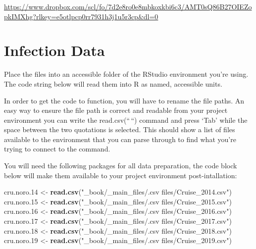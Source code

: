 \documentclass[
  11,
]{book}
\newenvironment{Shaded}{\begin{snugshade}}{\end{snugshade}}
\newcommand{\FloatTok}[1]{\textcolor[rgb]{0.06,0.06,0.06}{#1}}
\newcommand{\FunctionTok}[1]{\textcolor[rgb]{0.27,0.27,0.27}{\textbf{#1}}}
\newcommand{\NormalTok}[1]{#1}
\newcommand{\OtherTok}[1]{\textcolor[rgb]{0.37,0.37,0.37}{#1}}
\newcommand{\StringTok}[1]{\textcolor[rgb]{0.5,0.5,0.5}{#1}}
\begin{document}
\url{https://www.dropbox.com/scl/fo/7d2e8ro0e8mbkoxkbi6c3/AMT0sQ86B27OIEZopkIMXhg?rlkey=e5otlpcp0rr7931h3j1u5r3cp\&dl=0}

\hypertarget{infection-data}{%
\section*{Infection Data}\label{infection-data}}


Place the files into an accessible folder of the RStudio environment you're using. The code string below will read them into R as named, accessible units.

In order to get the code to function, you will have to rename the file paths. An easy way to ensure the file path is correct and readable from your project environment you can write the read.csv(``\,``) command and press `Tab' while the space between the two quotations is selected. This should show a list of files available to the environment that you can parse through to find what you're trying to connect to the command.

You will need the following packages for all data preparation, the code block below will make them available to your project environment post-intallation:

\begin{Shaded}
\begin{Highlighting}[]
\NormalTok{cru.noro}\FloatTok{.14} \OtherTok{\textless{}{-}} \FunctionTok{read.csv}\NormalTok{(}\StringTok{"\_book/\_main\_files/.csv files/Cruise\_2014.csv"}\NormalTok{)}
\NormalTok{cru.noro}\FloatTok{.15} \OtherTok{\textless{}{-}} \FunctionTok{read.csv}\NormalTok{(}\StringTok{"\_book/\_main\_files/.csv files/Cruise\_2015.csv"}\NormalTok{)}
\NormalTok{cru.noro}\FloatTok{.16} \OtherTok{\textless{}{-}} \FunctionTok{read.csv}\NormalTok{(}\StringTok{"\_book/\_main\_files/.csv files/Cruise\_2016.csv"}\NormalTok{)}
\NormalTok{cru.noro}\FloatTok{.17} \OtherTok{\textless{}{-}} \FunctionTok{read.csv}\NormalTok{(}\StringTok{"\_book/\_main\_files/.csv files/Cruise\_2017.csv"}\NormalTok{)}
\NormalTok{cru.noro}\FloatTok{.18} \OtherTok{\textless{}{-}} \FunctionTok{read.csv}\NormalTok{(}\StringTok{"\_book/\_main\_files/.csv files/Cruise\_2018.csv"}\NormalTok{)}
\NormalTok{cru.noro}\FloatTok{.19} \OtherTok{\textless{}{-}} \FunctionTok{read.csv}\NormalTok{(}\StringTok{"\_book/\_main\_files/.csv files/Cruise\_2019.csv"}\NormalTok{)}
\end{Highlighting}
\end{Shaded}
\end{document}
